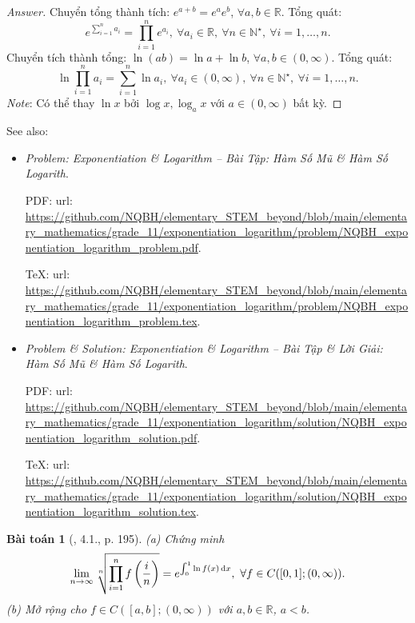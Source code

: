 \documentclass{article}
\newtheorem{baitoan}{Bài toán}
\begin{document}
\begin{proof}[Answer]
	Chuyển tổng thành tích: $e^{a + b} = e^ae^b$, $\forall a,b\in\mathbb{R}$. Tổng quát:
	\begin{equation*}
		e^{\sum_{i=1}^n a_i} = \prod_{i=1}^n e^{a_i},\ \forall a_i\in\mathbb{R},\ \forall n\in\mathbb{N}^\star,\ \forall i = 1,\ldots,n.
	\end{equation*}
	Chuyển tích thành tổng: $\ln(ab) = \ln a + \ln b$, $\forall a,b\in(0,\infty)$. Tổng quát:
	\begin{equation*}
		\ln\prod_{i=1}^n a_i = \sum_{i=1}^n \ln a_i,\ \forall a_i\in(0,\infty),\ \forall n\in\mathbb{N}^\star,\ \forall i = 1,\ldots,n.
	\end{equation*}
	{\it Note}: Có thể thay $\ln x$ bởi $\log x,\log_a x$ với $a\in(0,\infty)$ bất kỳ.
\end{proof}
See also:
\begin{itemize}
	\item {\it Problem: Exponentiation \& Logarithm -- Bài Tập: Hàm Số Mũ \& Hàm Số Logarith}.
	
	PDF: {\sc url}: \url{https://github.com/NQBH/elementary_STEM_beyond/blob/main/elementary_mathematics/grade_11/exponentiation_logarithm/problem/NQBH_exponentiation_logarithm_problem.pdf}.
	
	\TeX: {\sc url}: \url{https://github.com/NQBH/elementary_STEM_beyond/blob/main/elementary_mathematics/grade_11/exponentiation_logarithm/problem/NQBH_exponentiation_logarithm_problem.tex}.
	\item {\it Problem \& Solution: Exponentiation \& Logarithm -- Bài Tập \& Lời Giải: Hàm Số Mũ \& Hàm Số Logarith}.
	
	PDF: {\sc url}: \url{https://github.com/NQBH/elementary_STEM_beyond/blob/main/elementary_mathematics/grade_11/exponentiation_logarithm/solution/NQBH_exponentiation_logarithm_solution.pdf}.
	
	\TeX: {\sc url}: \url{https://github.com/NQBH/elementary_STEM_beyond/blob/main/elementary_mathematics/grade_11/exponentiation_logarithm/solution/NQBH_exponentiation_logarithm_solution.tex}.
\end{itemize}

\begin{baitoan}[\cite{Quoc_Long_Dat_Nam_VMC}, 4.1., p. 195]
	(a) Chứng minh
	\begin{equation*}
		\lim_{n\to\infty} \sqrt[n]{\prod_{i=1}^n f\left(\frac{i}{n}\right)} = e^{\int_0^1 \ln f(x)\,{\rm d}x},\ \forall f\in C([0,1];(0,\infty)).
	\end{equation*}
	(b) Mở rộng cho $f\in C([a,b];(0,\infty))$ với $a,b\in\mathbb{R}$, $a < b$.
\end{baitoan}
\end{document}
